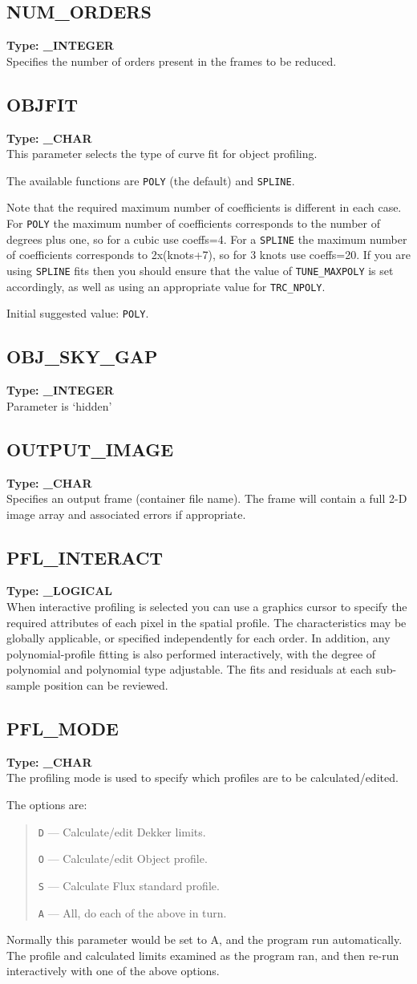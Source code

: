 \documentclass[11pt,twoside]{article}
\makeatletter
\newcommand{\stardocinitials}  {SUN}
\newcommand{\stardocnumber}    {152.4}
\newcommand{\stardocname}{\stardocinitials /\stardocnumber}
\newcommand{\htmlref}[2]{#1}
\newcommand{\xlabel}[1]{}
\newcommand{\sunspec}[2]{#1}
\renewcommand{\sunspec}[2]{#2}
\newcommand{\indexcmdname}[1]{\index{#1@\protect\cmdname{#1}}}
\renewcommand{\indexcmdname}[1]{}
\newcommand{\cmdname}{\begingroup \catcode`\_=12 \realcmdname}
\newcommand{\realcmdname}[1]{\endgroup\texttt{#1}}
\newcommand{\echparameter}[4]
{
\item [#1 = #3] \mbox{}\label{par_#2}\indexcmdname{#2}
\\
#4
}
\renewcommand{\echparameter}[4]
{
  \subsection{\xlabel{par_#2}\label{par_#2}{\bf #1}}
  {\bf Type: #3}\\
#4
}
\makeatother
\begin{document}
\echparameter{NUM\_ORDERS}{NUM_ORDERS}{
 \_INTEGER
}{
 Specifies the number of orders present in the frames to be reduced.
}

\echparameter{OBJFIT}{OBJFIT}{
 \_CHAR
}{
 This parameter selects the type of curve fit for object profiling.

 The available functions are \texttt{POLY} (the default) and \texttt{SPLINE}.

 Note that the required maximum number of coefficients is different
 in each case.  For \texttt{POLY} the maximum number of coefficients
 corresponds to the number of degrees plus one, so for a cubic use coeffs=4.
 For a \texttt{SPLINE} the maximum number of coefficients corresponds to
 \sunspec{(knots+7)$\times$2}{2x(knots+7)}, so for 3 knots use coeffs=20.
 If you are using \texttt{SPLINE}
 fits then you should ensure that the value of
 \htmlref{{\tt{TUNE\_MAXPOLY}}}{par_TUNE_MAXPOLY} is set
 accordingly, as well as using an appropriate value for
 \htmlref{{\tt{TRC\_NPOLY}}}{par_TRC_NPOLY}.

 Initial suggested value: \texttt{POLY}.
}

\echparameter{OBJ\_SKY\_GAP}{OBJ_SKY_GAP}{
 \_INTEGER
}{
 Parameter is `hidden'
}

\echparameter{OUTPUT\_IMAGE}{OUTPUT_IMAGE}{
 \_CHAR
}{
 Specifies an output frame (container file name).  The frame will
 contain a full 2-D image array and associated errors if appropriate.
}

\markboth{PARAMETERS: P}{\stardocname}
\echparameter{PFL\_INTERACT}{PFL_INTERACT}{
 \_LOGICAL
}{
 When interactive profiling is selected you can use a graphics
 cursor to specify the required attributes of each pixel in the
 spatial profile.  The characteristics may be globally applicable,
 or specified independently for each order.  In addition, any
 polynomial-profile fitting is also performed interactively, with
 the degree of polynomial and polynomial type adjustable.
 The fits and residuals at each sub-sample position can be reviewed.
}

\echparameter{PFL\_MODE}{PFL_MODE}{
 \_CHAR
}{
 The profiling mode is used to specify which profiles are to be
 calculated/edited.

 The options are:

 \begin{quote}

    {\tt D} --- Calculate/edit Dekker limits.

    {\tt O} --- Calculate/edit Object profile.

    {\tt S} --- Calculate Flux standard profile.

    {\tt A} --- All, do each of the above in turn.

 \end{quote}

 Normally this parameter would be set to A, and the program run
 automatically.  The profile and calculated limits examined as the
 program ran, and then re-run interactively with one of the above
 options.
}
\end{document}
